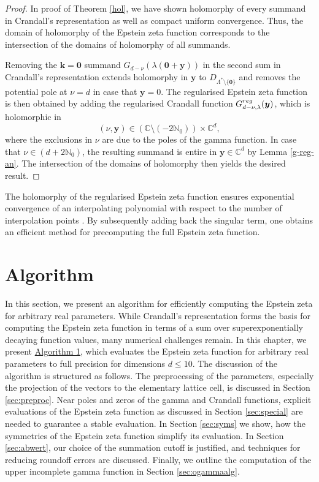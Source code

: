 \documentclass[]{amsart}
\numberwithin{mythm}{section}
\begin{document}
\begin{proof}
In proof of
Theorem \ref{hol}, we have shown holomorphy of every summand in Crandall's representation as well as compact uniform convergence. Thus, the domain of holomorphy of the Epstein zeta function corresponds to the intersection of the domains of holomorphy of all summands.

Removing the $\bm k=\bm 0$ summand 
$G_{d-\nu}(\lambda(\bm 0+\bm y))$
in the second sum in Crandall's representation
extends holomorphy in $\bm y$ to $D_{\Lambda^\ast\setminus \{\bm 0\}}$ and removes the potential pole at $\nu = d$ in case that $\bm y = 0$.
The regularised Epstein zeta function is then obtained by adding the regularised Crandall function
$G_{d-\nu,\lambda}^{\rm reg}(\bm y)$,
which is holomorphic in 
\[
(\nu,\bm y) \in (\mathds C\setminus (-2\mathds N_0))\times \mathds C^d,
\]
where the exclusions in $\nu$ are due to the poles of the gamma function.
In case that $\nu \in (d+2\mathds N_0)$,
the resulting summand is entire in $\bm y\in\mathds C^d$ by 
Lemma \ref{g-reg-an}. The intersection of the domains of holomorphy then yields the desired result. 
\end{proof}


The holomorphy of the
regularised Epstein zeta function
ensures exponential convergence of an interpolating polynomial with respect to the number of interpolation points \cite{berrutBarycentricLagrangeInterpolation2004}. By subsequently adding back the singular term, one obtains an efficient method for precomputing the full Epstein zeta function.

\section{Algorithm}
\label{sec:algorithm}
In this section, we present an algorithm for efficiently computing the Epstein zeta for arbitrary real parameters. While Crandall's representation forms the basis for computing the Epstein zeta function in terms of a sum over superexponentially decaying function values, many numerical challenges remain. 
In this chapter, we present \hyperref[alg]{Algorithm 1}, which evaluates the Epstein zeta function for arbitrary real parameters to full precision for dimensions $d\le 10$. The discussion of the algorithm is structured as follows.
The preprocessing of the parameters, especially the projection of the vectors to the elementary lattice cell, is discussed in 
Section \ref{sec:preproc}. 
Near poles and zeros of the gamma and Crandall functions, explicit evaluations of the Epstein zeta function as discussed in 
Section \ref{sec:special} are needed to guarantee a stable evaluation.
In 
Section \ref{sec:syms} we show, how the symmetries of the Epstein zeta function simplify its evaluation.
In 
Section \ref{sec:abwert}, our choice of the summation cutoff is justified, and techniques for reducing roundoff errors are discussed.
Finally, we outline the computation of the upper incomplete gamma function in 
Section \ref{sec:ogammaalg}.
\end{document}
